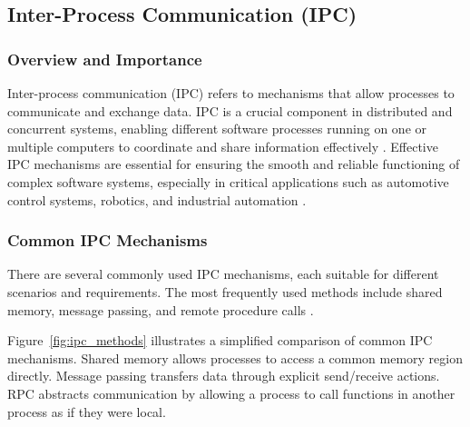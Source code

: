 \subsection{Inter-Process Communication (IPC)}

\subsubsection{Overview and Importance}

Inter-process communication (IPC) refers to mechanisms that allow processes to communicate and exchange data. IPC is a crucial component in distributed and concurrent systems, enabling different software processes running on one or multiple computers to coordinate and share information effectively \cite{stallings2018}. Effective IPC mechanisms are essential for ensuring the smooth and reliable functioning of complex software systems, especially in critical applications such as automotive control systems, robotics, and industrial automation \cite{tanenbaum2015}.

\subsubsection{Common IPC Mechanisms}

There are several commonly used IPC mechanisms, each suitable for different scenarios and requirements. The most frequently used methods include shared memory, message passing, and remote procedure calls \cite{stallings2018,tanenbaum2015}.

\vspace{1em}
Figure~\ref{fig:ipc_methods} illustrates a simplified comparison of common IPC mechanisms. Shared memory allows processes to access a common memory region directly. Message passing transfers data through explicit send/receive actions. RPC abstracts communication by allowing a process to call functions in another process as if they were local.

